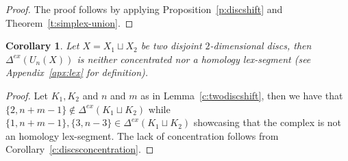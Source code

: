 \documentclass[11pt]{article}
\newtheorem{corollary}[theorem]{Corollary}
\numberwithin{claimcounter}{theorem}
\theoremstyle{remark}
\theoremstyle{definition}
\numberwithin{theorem}{section}
\newcommand{\exshift}[1]{\Delta^{ex}(#1)}
\begin{document}
\begin{proof}
    The proof follows by applying Proposition~\ref{p:discshift} and Theorem~\ref{t:simplex-union}.
\end{proof}
%
\begin{corollary}
    Let $X=X_1\sqcup X_2$ be two disjoint $2$-dimensional discs, then $\exshift{U_n(X)}$ is neither concentrated nor a homology lex-segment (see Appendix~\ref{apx:lex} for definition).
\end{corollary}
\begin{proof}
    Let $K_1,K_2$ and $n$ and $m$ as in Lemma~\ref{c:twodiscshift}, then we have that $\{2,n+m-1\}\notin \exshift{K_1\sqcup K_2}$ while $\{1,n+m-1\},\{3,n-3\}\in \exshift{K_1\sqcup K_2}$ showcasing that the complex is not an homology lex-segment. The lack of concentration follows from  Corollary~\ref{c:discsconcentration}.
\end{proof}
%
\noindent
%
%
\end{document}
